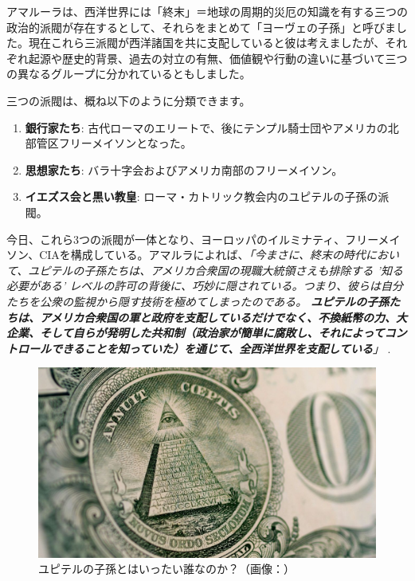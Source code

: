 \documentclass[10pt,twocolumn,letterpaper]{article}
\begin{document}
アマルーラは、西洋世界には「終末」＝地球の周期的災厄の知識を有する三つの政治的派閥が存在するとして、それらをまとめて「ヨーヴェの子孫」と呼びました。現在これら三派閥が西洋諸国を共に支配していると彼は考えましたが、それぞれ起源や歴史的背景、過去の対立の有無、価値観や行動の違いに基づいて三つの異なるグループに分かれているともしました。

三つの派閥は、概ね以下のように分類できます。

\begin{flushleft}
\begin{enumerate}
    \item \textbf{銀行家たち}: 古代ローマのエリートで、後にテンプル騎士団やアメリカの北部管区フリーメイソンとなった。
    \item \textbf{思想家たち}: バラ十字会およびアメリカ南部のフリーメイソン。
    \item \textbf{イエズス会と黒い教皇}: ローマ・カトリック教会内のユピテルの子孫の派閥。
\end{enumerate}
\end{flushleft}

今日、これら3つの派閥が一体となり、ヨーロッパのイルミナティ、フリーメイソン、CIAを構成している。アマルラによれば、\textit{「今まさに、終末の時代において、ユピテルの子孫たちは、アメリカ合衆国の現職大統領さえも排除する '知る必要がある' レベルの許可の背後に、巧妙に隠されている。つまり、彼らは自分たちを公衆の監視から隠す技術を極めてしまったのである。 \textbf{ユピテルの子孫たちは、アメリカ合衆国の軍と政府を支配しているだけでなく、不換紙幣の力、大企業、そして自らが発明した共和制（政治家が簡単に腐敗し、それによってコントロールできることを知っていた）を通じて、全西洋世界を支配している}」} \cite{33,34}.

\begin{figure}[h]
\begin{center}
   \includegraphics[width=1\linewidth]{illuminati.jpg}
\end{center}
   \caption{ユピテルの子孫とはいったい誰なのか？（画像：\cite{35}）}
\label{fig:10}
\label{fig:onecol}
\end{figure}
\end{document}
